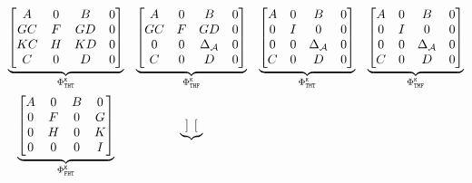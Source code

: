     \begin{equation}
        \label{eq:cont-kill} 
        \begin{matrix}
            \underbrace{\begin{bmatrix}
                A  & 0 & B & 0 \\
                GC & F & GD & 0 \\
                KC & H & KD & 0 \\
                C & 0 & D & 0 \\
            \end{bmatrix}}_{\clmat_{\cT\cH\cT}^{\Kill}} &
            \underbrace{\begin{bmatrix}
                A & 0 & B & 0 \\
                GC & F & GD & 0 \\
                0 & 0 & \Delta_\actuator & 0 \\
                C & 0 & D & 0
            \end{bmatrix}}_{\clmat_{\cT\cH\cF}^{\Kill}} &
            \underbrace{\begin{bmatrix}
                A & 0 & B & 0 \\
                0 & I & 0 & 0 \\
                0 & 0 & \Delta_\actuator & 0 \\
                C & 0 & D & 0
            \end{bmatrix}}_{\clmat_{\cT\cM\cT}^{\Kill}} &
            \underbrace{\begin{bmatrix}
                A & 0 & B & 0 \\
                0 & I & 0 & 0 \\
                0 & 0 & \Delta_\actuator & 0 \\
                C & 0 & D & 0
            \end{bmatrix}}_{\clmat_{\cT\cM\cF}^{\Kill}} \\[4em]
            \underbrace{\begin{bmatrix}
                A & 0 & B & 0 \\
                0 & F & 0 & G \\
                0 & H & 0 & K \\
                0 & 0 & 0 & I
            \end{bmatrix}}_{\clmat_{\cF\cH\cT}^{\Kill}} &
            \underbrace{\begin{bmatrix}

\end{bmatrix}}
\end{matrix}
\end{equation}
